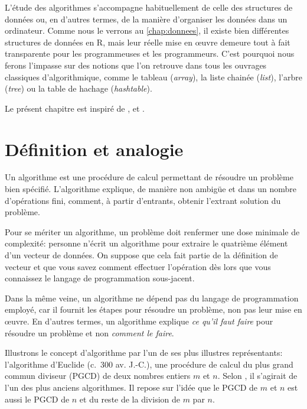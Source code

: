 L'étude des algorithmes s'accompagne habituellement de celle des
structures de données ou, en d'autres termes, de la manière
d'organiser les données dans un ordinateur. Comme nous le verrons au
\autoref{chap:donnees}, il existe bien différentes structures de
données en R, mais leur réelle mise en œuvre demeure tout à fait
transparente pour les programmeuses et les programmeurs. C'est
pourquoi nous ferons l'impasse sur des notions que l'on retrouve dans
tous les ouvrages classiques d'algorithmique, comme le tableau
(\emph{array}), la liste chainée (\emph{list}), l'arbre (\emph{tree})
ou la table de hachage (\emph{hashtable}).

Le présent chapitre est inspiré de \citet{Sussman:scheme:1996},
\citet{Knuth:ACP:vol1:1997} et \citet{Stephens:algorithms:2013}.


\section{Définition et analogie}
\label{sec:algorithmes:definition}

Un algorithme est une procédure de calcul
permettant de résoudre un problème bien spécifié. L'algorithme
explique, de manière non ambigüe et dans un nombre d'opérations fini,
comment, à partir d'entrants, obtenir l'extrant solution du problème.

Pour se mériter un algorithme, un problème doit renfermer une dose
minimale de complexité: personne n'écrit un algorithme pour extraire
le quatrième élément d'un vecteur de données. On suppose que cela fait
partie de la définition de vecteur et que vous savez comment effectuer
l'opération dès lors que vous connaissez le langage de programmation
sous-jacent.

Dans la même veine, un algorithme ne dépend pas du langage de
programmation employé, car il fournit les étapes pour résoudre un
problème, non pas leur mise en œuvre. En d'autres termes, un
algorithme explique \emph{ce qu'il faut faire} pour résoudre un
problème et non \emph{comment le faire}.

Illustrons le concept d'algorithme par l'un de ses plus illustres
représentants: l'algorithme
d'Euclide (c.~300 av. J.-C.), une procédure de calcul du plus grand
commun diviseur (PGCD) de deux nombres entiers $m$ et $n$. Selon
\citet{Knuth:ACP:vol2:1997}, il s'agirait de l'un des plus anciens
algorithmes. Il repose sur l'idée que le PGCD de $m$ et $n$ est aussi
le PGCD de $n$ et du reste de la division de $m$ par $n$.

